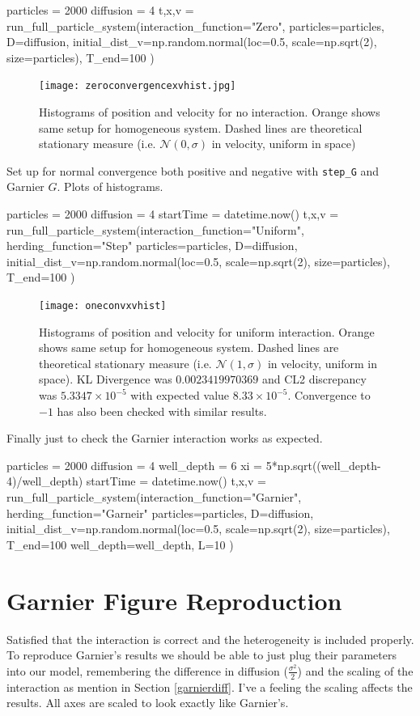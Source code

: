 \documentclass[11pt,a4paper, final, dvipsnames]{article}
\begin{document}
\begin{python}
particles = 2000
diffusion = 4
t,x,v = run_full_particle_system(interaction_function="Zero",
particles=particles,
D=diffusion,
initial_dist_v=np.random.normal(loc=0.5, scale=np.sqrt(2), size=particles),
T_end=100
)
\end{python}
\begin{figure}
    \centering
    \texttt{[image: zeroconvergencexvhist.jpg]}
    \caption{Histograms of position and velocity for no interaction. Orange shows same setup for homogeneous system. Dashed lines are theoretical stationary measure (i.e. $\mathcal{N}(0,\sigma)$ in velocity, uniform in space)}
\end{figure}


Set up for normal convergence both positive and negative with \verb|step_G| and Garnier $G$. Plots of histograms. 

\begin{python}
particles = 2000
diffusion = 4
startTime = datetime.now()
t,x,v = run_full_particle_system(interaction_function="Uniform", 
herding_function="Step"
particles=particles,
D=diffusion,
initial_dist_v=np.random.normal(loc=0.5, scale=np.sqrt(2), size=particles),
T_end=100
)
\end{python}
\begin{figure}
    \centering
    \texttt{[image: oneconvxvhist]}
    \caption{Histograms of position and velocity for uniform interaction. Orange shows same setup for homogeneous system. Dashed lines are theoretical stationary measure (i.e. $\mathcal{N}(1,\sigma)$ in velocity, uniform in space). KL Divergence was $0.0023419970369$ and CL2 discrepancy was $5.3347 \times 10 ^{-5}$ with expected value $8.33\times 10^{-5}$. Convergence to $-1$ has also been checked with similar results.}
\end{figure}
Finally just to check the Garnier interaction works as expected.
\begin{python}
particles = 2000
diffusion = 4
well_depth = 6
xi = 5*np.sqrt((well_depth-4)/well_depth)
startTime = datetime.now()
t,x,v = run_full_particle_system(interaction_function="Garnier", 
herding_function="Garneir"
particles=particles,
D=diffusion,
initial_dist_v=np.random.normal(loc=0.5, scale=np.sqrt(2), size=particles),
T_end=100
well_depth=well_depth,
L=10
)
\end{python}

    \section{Garnier Figure Reproduction}
    Satisfied that the interaction is correct and the heterogeneity is included properly. To reproduce Garnier's results we should be able to just plug their parameters into our model, remembering the difference in diffusion ($\frac{\sigma^2}{2}$) and the scaling of the interaction as mention in Section \ref{garnierdiff}. I've a feeling the scaling affects the results. All axes are scaled to look exactly like Garnier's.
\end{document}
